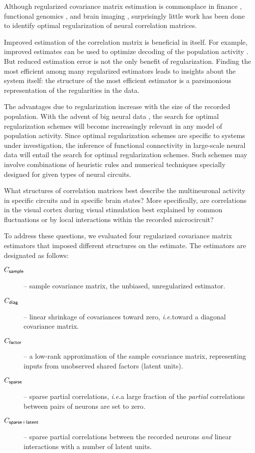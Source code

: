 Although regularized covariance matrix estimation is commonplace in finance \cite{Ledoit:2003}, functional genomics \cite{Schafer:2005}, and brain imaging \cite{Ryali:2012}, surprisingly little work has been done to identify optimal regularization of neural correlation matrices.

Improved estimation of the correlation matrix is beneficial in itself. For example, improved estimates can be used to optimize  decoding of the population activity \cite{Friedman:1989}. But reduced estimation error is not the only benefit of regularization.  Finding the most efficient among many regularized estimators leads to insights about the system itself: the structure of the most efficient estimator is a parsimonious representation of the regularities in the data.

The advantages due to regularization increase with the size of the recorded population. With the advent of  big neural data \cite{Alivisatos:2013}, the search for optimal regularization schemes will become increasingly relevant in any model of population activity. Since optimal regularization schemes are specific to systems under investigation, the inference of functional connectivity in large-scale neural data will entail the search for optimal regularization schemes. Such schemes may involve combinations of heuristic rules and numerical techniques specially designed for given types of neural circuits.

What structures of correlation matrices best describe the multineuronal activity in specific circuits and in specific brain states?  More specifically, are correlations in the visual cortex during visual stimulation best explained by common fluctuations or by local interactions within the recorded microcircuit?

To address these questions, we evaluated four regularized covariance matrix estimators that imposed different structures on the estimate. The estimators are designated as follows:
\begin{description}
\item[$C_{\sf sample}$] -- sample covariance matrix, the unbiased, unregularized estimator.
\item[$C_{\sf diag}$] -- linear shrinkage of covariances toward zero, \emph{i.e.}\;toward a diagonal covariance matrix.
\item[$C_{\sf factor}$] -- a low-rank approximation of the sample covariance matrix, representing inputs from unobserved shared factors (latent units).
\item[$C_{\sf sparse}$] -- sparse partial correlations, \emph{i.e.}\;a large fraction of the \emph{partial} correlations between pairs of neurons are set to zero.
\item[$C_{\sf sparse+latent}$] -- sparse partial correlations between the recorded neurons \emph{and} linear interactions with a number of latent units.
\end{description}

